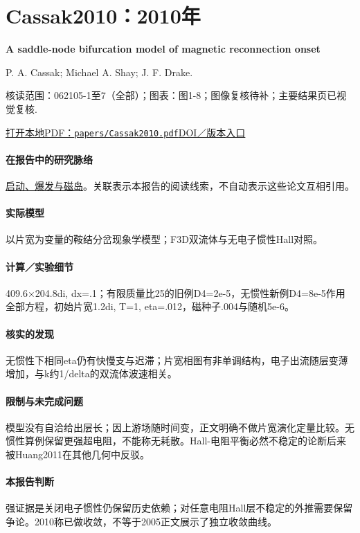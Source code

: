 \section{Cassak2010：2010年}\label{paper:Cassak2010}

\textbf{A saddle-node bifurcation model of magnetic reconnection onset}\citep{Cassak2010}\

P. A. Cassak;  Michael A. Shay;  J. F. Drake.

\textsf{核读范围：}062105-1至7（全部）；\textsf{图表：}图1-8；图像复核待补；主要结果页已视觉复核.

\href{run:papers/Cassak2010.pdf}{打开本地PDF：\texttt{papers/Cassak2010.pdf}}\quad\href{https://doi.org/10.1063/1.3435269}{DOI／版本入口}

\paragraph{在报告中的研究脉络}\hyperref[story:onset]{启动、爆发与磁岛}。关联表示本报告的阅读线索，不自动表示这些论文互相引用。

\paragraph{实际模型}以片宽为变量的鞍结分岔现象学模型；F3D双流体与无电子惯性Hall对照。

\paragraph{计算／实验细节}409.6×204.8di, dx=.1；有限质量比25的旧例D4=2e-5，无惯性新例D4=8e-5作用全部方程，初始片宽1.2di, T=1, eta=.012，磁种子.004与随机5e-6。

\paragraph{核实的发现}无惯性下相同eta仍有快慢支与迟滞；片宽相图有非单调结构，电子出流随层变薄增加，与k约1/delta的双流体波速相关。

\paragraph{限制与未完成问题}模型没有自洽给出层长；因上游场随时间变，正文明确不做片宽演化定量比较。无惯性算例保留更强超电阻，不能称无耗散。Hall-电阻平衡必然不稳定的论断后来被Huang2011在其他几何中反驳。

\paragraph{本报告判断}强证据是关闭电子惯性仍保留历史依赖；对任意电阻Hall层不稳定的外推需要保留争论。2010称已做收敛，不等于2005正文展示了独立收敛曲线。


